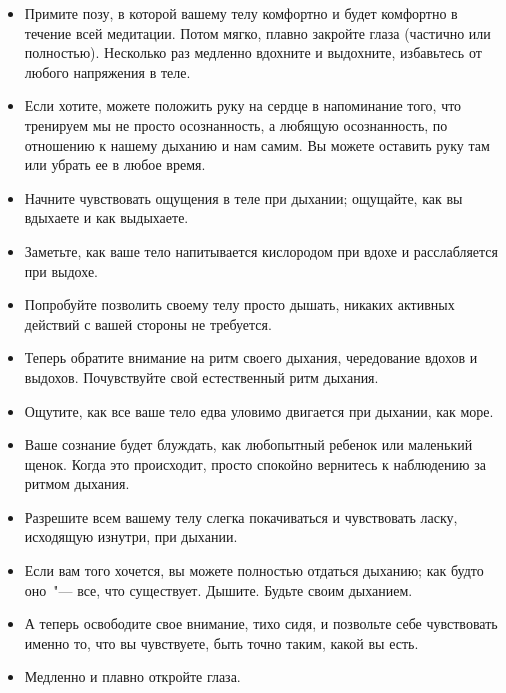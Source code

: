 \begin{itemize}
	\item Примите позу, в которой вашему телу комфортно и будет комфортно в течение всей медитации. Потом мягко, плавно закройте глаза (частично или полностью). Несколько раз медленно вдохните и выдохните, избавьтесь от любого напряжения в теле.

	\item Если хотите, можете положить руку на сердце в напоминание того, что тренируем мы не просто осознанность, а любящую осознанность, по отношению к нашему дыханию и нам самим. Вы можете оставить руку там или убрать ее в любое время.
	
	\item Начните чувствовать ощущения в теле при дыхании; ощущайте, как вы вдыхаете и как выдыхаете.
	
	\item Заметьте, как ваше тело напитывается кислородом при вдохе и расслабляется при выдохе.
	
	\item Попробуйте позволить своему телу просто дышать, никаких активных действий с вашей стороны не требуется.
	
	\item Теперь обратите внимание на ритм своего дыхания, чередование вдохов и выдохов. Почувствуйте свой естественный ритм дыхания.
	
	\item Ощутите, как все ваше тело едва уловимо двигается при дыхании, как море.
	
	\item Ваше сознание будет блуждать, как любопытный ребенок или маленький щенок. Когда это происходит, просто спокойно вернитесь к наблюдению за ритмом дыхания.
	
	\item Разрешите всем вашему телу слегка покачиваться и чувствовать ласку, исходящую изнутри, при дыхании.
	
	\item Если вам того хочется, вы можете полностью отдаться дыханию; как будто оно~"--- все, что существует. Дышите. Будьте своим дыханием. 
	
	\item А теперь освободите свое внимание, тихо сидя, и позвольте себе чувствовать именно то, что вы чувствуете, быть точно таким, какой вы есть.
	\item Медленно и плавно откройте глаза. 
\end{itemize} 

